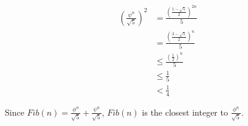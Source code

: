 \documentclass[a4paper]{report}
\begin{document}
\begin{align*}
({\frac{\psi^n}{\sqrt{5}}})^2 &=    \frac{({\frac{1-\sqrt{5}}{2}})^{2n}}{5} \\
                              &=    \frac{({\frac{3-\sqrt{5}}{2}})^{n}}{5} \\
                              &\leq \frac{(\frac{1}{2})^n}{5} \\
                              &\leq \frac{1}{5} \\
                              &<    \frac{1}{4}
\end{align*}

Since $Fib(n)=\frac{\phi^n}{\sqrt{5}}+\frac{\psi^n}{\sqrt{5}}$, $Fib(n)$ is the closest
 integer to $\frac{\phi^n}{\sqrt{5}}$.
\end{document}
